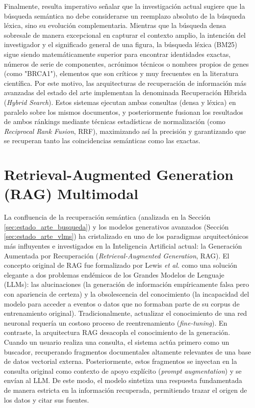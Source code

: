\documentclass[a4paper]{report}
\begin{document}
Finalmente, resulta imperativo señalar que la investigación actual sugiere que la búsqueda semántica no debe considerarse un reemplazo absoluto de la búsqueda léxica, sino su evolución complementaria. Mientras que la búsqueda densa sobresale de manera excepcional en capturar el contexto amplio, la intención del investigador y el significado general de una figura, la búsqueda léxica (BM25) sigue siendo matemáticamente superior para encontrar identidades exactas, números de serie de componentes, acrónimos técnicos o nombres propios de genes (como "BRCA1"), elementos que son críticos y muy frecuentes en la literatura científica. Por este motivo, las arquitecturas de recuperación de información más avanzadas del estado del arte implementan la denominada Recuperación Híbrida (\textit{Hybrid Search}). Estos sistemas ejecutan ambas consultas (densa y léxica) en paralelo sobre los mismos documentos, y posteriormente fusionan los resultados de ambos ránkings mediante técnicas estadísticas de normalización (como \textit{Reciprocal Rank Fusion}, RRF), maximizando así la precisión y garantizando que se recuperan tanto las coincidencias semánticas como las exactas.


\begingroup
\let\clearpage\relax %
\let\newpage\relax   %
\vspace{0.5cm}
\section{Retrieval-Augmented Generation (RAG) Multimodal}
\label{sec:estado_arte_rag}
\endgroup

La confluencia de la recuperación semántica (analizada en la Sección \ref{sec:estado_arte_busqueda}) y los modelos generativos avanzados (Sección \ref{sec:estado_arte_vlms}) ha cristalizado en uno de los paradigmas arquitectónicos más influyentes e investigados en la Inteligencia Artificial actual: la Generación Aumentada por Recuperación (\textit{Retrieval-Augmented Generation}, RAG). El concepto original de RAG fue formalizado por Lewis \textit{et al.} \cite{lewis2020retrieval} como una solución elegante a dos problemas endémicos de los Grandes Modelos de Lenguaje (LLMs): las alucinaciones (la generación de información empíricamente falsa pero con apariencia de certeza) y la obsolescencia del conocimiento (la incapacidad del modelo para acceder a eventos o datos que no formaban parte de su corpus de entrenamiento original). Tradicionalmente, actualizar el conocimiento de una red neuronal requería un costoso proceso de reentrenamiento (\textit{fine-tuning}). En contraste, la arquitectura RAG desacopla el conocimiento de la generación. Cuando un usuario realiza una consulta, el sistema actúa primero como un buscador, recuperando fragmentos documentales altamente relevantes de una base de datos vectorial externa. Posteriormente, estos fragmentos se inyectan en la consulta original como contexto de apoyo explícito (\textit{prompt augmentation}) y se envían al LLM. De este modo, el modelo sintetiza una respuesta fundamentada de manera estricta en la información recuperada, permitiendo trazar el origen de los datos y citar sus fuentes.
\end{document}
